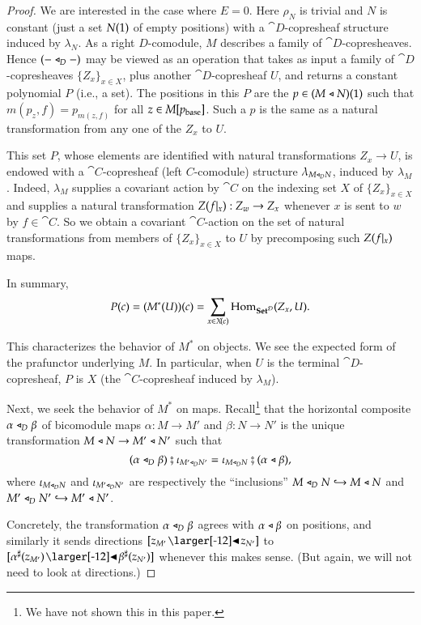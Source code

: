 \documentclass{amsart}
\begin{document}
\begin{proof}
  We are interested in the case where $E = 0$. Here $\rho_N$ is
  trivial and $N$ is constant (just a set $N(1)$ of empty
  positions) with a $\cat{D}$-copresheaf structure induced by
  $\lambda_N$. As a right $D$-comodule, $M$ describes a family of
  $\cat{D}$-copresheaves. Hence $(- \mathrel{\triangleleft}_D -)$ may be viewed as an
  operation that takes as input a family of $\cat{D}$-copresheaves
  $\{Z_x\}_{x \in X}$, plus another $\cat{D}$-copresheaf $U$, and
  returns a constant polynomial $P$ (i.e., a set). The positions in
  this $P$ are the $p \in (M \mathrel{\triangleleft} N)(1)$ such that
  $m(p_z, f) = p_{m(z, f)}$ for all $z \in M[p_{\mathrm{base}}]$. Such a $p$ is
  the same as a natural transformation from any one of the $Z_x$ to
  $U$.

  This set $P$, whose elements are identified with natural
  transformations $Z_x \to U$, is endowed with a
  $\cat{C}$-copresheaf (left $C$-comodule) structure
  $\lambda_{M \mathrel{\triangleleft}_D N}$, induced by $\lambda_M$. Indeed, $\lambda_M$
  supplies a covariant action by $\cat{C}$ on the indexing set $X$ of
  $\{Z_x\}_{x \in X}$ and supplies a natural transformation
  $Z(f|_{x}): Z_w \to Z_x$ whenever $x$ is sent to $w$ by
  $f \in \cat{C}$. So we obtain a covariant $\cat{C}$-action on the
  set of natural transformations from members of $\{Z_x\}_{x \in X}$
  to $U$ by precomposing such $Z(f|_{x})$ maps.

  In summary,
  \[P(c) = (M^*(U))(c) = \sum_{x \in X\!(c)}\operatorname{Hom}_{{\normalfont\mathbf{Set}}^{\mathcal{D}}}(Z_x, U).\]

  This characterizes the behavior of $M^*$ on objects. We see the
  expected form of the prafunctor underlying $M$. In particular,
  when $U$ is the terminal $\cat{D}$-copresheaf, $P$ is $X$ (the
  $\cat{C}$-copresheaf induced by $\lambda_M$).
  
  Next, we seek the behavior of $M^*$ on maps. Recall\footnote{We have
    not shown this in this paper.} that the horizontal composite
  $\alpha \mathrel{\triangleleft}_D \beta$ of bicomodule maps $\alpha: M \to M'$ and
  $\beta: N \to N'$ is the unique transformation
  $M \mathrel{\triangleleft} N \to M' \mathrel{\triangleleft} N'$ such that
  \[(\alpha \mathrel{\triangleleft}_D \beta) \fatsemi \iota_{M' \mathrel{\triangleleft}_D N'} = \iota_{M
      \mathrel{\triangleleft}_D N} \fatsemi (\alpha \mathrel{\triangleleft} \beta),\] where
  $\iota_{M \mathrel{\triangleleft}_D N}$ and $\iota_{M' \mathrel{\triangleleft}_D N'}$ are respectively the
  ``inclusions'' ${M \mathrel{\triangleleft}_D N \hookrightarrow M \mathrel{\triangleleft} N}$ and
  ${M' \mathrel{\triangleleft}_D N' \hookrightarrow M' \mathrel{\triangleleft} N'}$.

  Concretely, the transformation $\alpha \mathrel{\triangleleft}_D \beta$ agrees with
  $\alpha \mathrel{\triangleleft} \beta$ on positions, and similarly it sends directions
  $[z_{M'} \subd z_{N'}]$ to
  $[\anydirmapof{\alpha}{z_{M'}} \subd \anydirmapof{\beta}{z_{N'}}]$
  whenever this makes sense. (But again, we will not need to look at
  directions.)


\end{proof}
\end{document}
